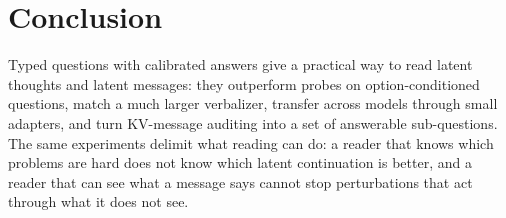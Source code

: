 \section{Conclusion}
Typed questions with calibrated answers give a practical way to read latent thoughts and latent messages: they outperform probes on option-conditioned questions, match a much larger verbalizer, transfer across models through small adapters, and turn KV-message auditing into a set of answerable sub-questions. The same experiments delimit what reading can do: a reader that knows which problems are hard does not know which latent continuation is better, and a reader that can see what a message says cannot stop perturbations that act through what it does not see.
